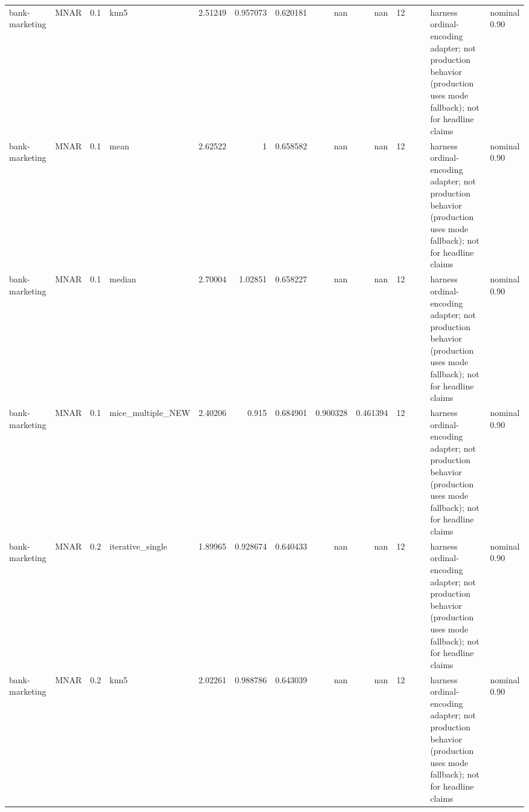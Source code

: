 \begin{table}[ht]
\begin{tabular}{llrlrrrrrrllll}
 bank-marketing       & MNAR        &         0.1 & knn5              &       2.51249  &             0.957073 &                 0.620181 &                     nan        &                       nan        &        12 &                    &                                         & harness ordinal-encoding adapter; not production behavior (production uses mode fallback); not for headline claims & nominal 0.90              \\
 bank-marketing       & MNAR        &         0.1 & mean              &       2.62522  &             1        &                 0.658582 &                     nan        &                       nan        &        12 &                    &                                         & harness ordinal-encoding adapter; not production behavior (production uses mode fallback); not for headline claims & nominal 0.90              \\
 bank-marketing       & MNAR        &         0.1 & median            &       2.70004  &             1.02851  &                 0.658227 &                     nan        &                       nan        &        12 &                    &                                         & harness ordinal-encoding adapter; not production behavior (production uses mode fallback); not for headline claims & nominal 0.90              \\
 bank-marketing       & MNAR        &         0.1 & mice\_multiple\_NEW &       2.40206  &             0.915    &                 0.684901 &                       0.900328 &                         0.461394 &        12 &                    &                                         & harness ordinal-encoding adapter; not production behavior (production uses mode fallback); not for headline claims & nominal 0.90              \\
 bank-marketing       & MNAR        &         0.2 & iterative\_single  &       1.89965  &             0.928674 &                 0.640433 &                     nan        &                       nan        &        12 &                    &                                         & harness ordinal-encoding adapter; not production behavior (production uses mode fallback); not for headline claims & nominal 0.90              \\
 bank-marketing       & MNAR        &         0.2 & knn5              &       2.02261  &             0.988786 &                 0.643039 &                     nan        &                       nan        &        12 &                    &                                         & harness ordinal-encoding adapter; not production behavior (production uses mode fallback); not for headline claims & nominal 0.90              \\

\end{tabular}
\end{table}
